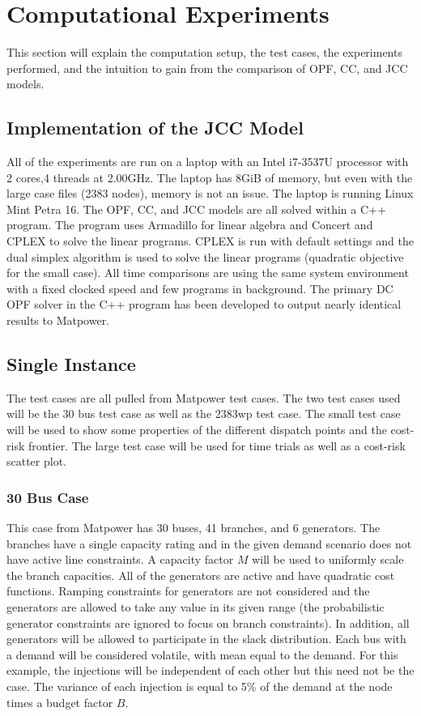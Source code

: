 \section{Computational Experiments}
This section will explain the computation setup, the test cases, the experiments performed, and the intuition to gain from the comparison of OPF, CC, and JCC models.
\subsection{Implementation of the JCC Model}
All of the experiments are run on a laptop with an Intel i7-3537U processor with 2 cores,4 threads at 2.00GHz.  The laptop has 8GiB of memory, but even with the large case files (2383 nodes), memory is not an issue.  The laptop is running Linux Mint Petra 16.  The OPF, CC, and JCC models are all solved within a C++ program.  The program uses Armadillo\cite{armadillo} for linear algebra and Concert and CPLEX to solve the linear programs.  CPLEX is run with default settings and the dual simplex algorithm is used to solve the linear programs (quadratic objective for the small case).  All time comparisons are using the same system environment with a fixed clocked speed and few programs in background.  The primary DC OPF solver in the C++ program has been developed to output nearly identical results to Matpower.\cite{matpower} 
\subsection{Single Instance}
The test cases are all pulled from Matpower test cases.  The two test cases used will be the 30 bus test case as well as the 2383wp test case.  The small test case will be used to show some properties of the different dispatch points and the cost-risk frontier.  The large test case will be used for time trials as well as a cost-risk scatter plot.  

\subsubsection*{30 Bus Case}
This case from Matpower has 30 buses, 41 branches, and 6 generators.  The branches have a single capacity rating and in the given demand scenario does not have active line constraints.  A capacity factor $M$ will be used to uniformly scale the branch capacities.  All of the generators are active and have quadratic cost functions.  Ramping constraints for generators are not considered and the generators are allowed to take any value in its given range (the probabilistic generator constraints are ignored to focus on branch constraints).  In addition, all generators will be allowed to participate in the slack distribution.  Each bus with a demand will be considered volatile, with mean equal to the demand.  For this example, the injections will be independent of each other but this need not be the case.  The variance of each injection is equal to 5\% of the demand at the node times a budget factor $B$.

